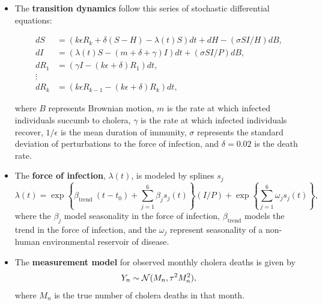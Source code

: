 \documentclass{article}
\begin{document}
\begin{itemize}
    \item The \textbf{transition dynamics} follow this series of stochastic differential equations:

    \begin{align}
        d S&=\left(k \epsilon R_k+\delta(S-H)-\lambda(t) S\right) d t+d H-(\sigma S I / H) d B, \\ 
        d I&=\left(\lambda(t) S-(m+\delta+\gamma) I\right) d t+(\sigma S I / P) d B, \\ 
        d R_1&=\left(\gamma I-(k \epsilon+\delta) R_1\right) d t, \\ 
        \vdots \\ 
        d R_k&=\left(k \epsilon R_{k-1}-(k \epsilon+\delta) R_k\right) d t,
    \end{align}
    
    where $B$ represents Brownian motion, $m$ is the rate at which infected individuals succumb to cholera, $\gamma$ is the rate at which infected individuals recover, $1/\epsilon$ is the mean duration of immunity, $\sigma$ represents the standard deviation of perturbations to the force of infection, and $\delta=0.02$ is the death rate. 

    \item The \textbf{force of infection}, $\lambda(t)$, is modeled by splines $s_j$
    \begin{equation}
        \lambda(t)=\exp \left\{\beta_{\text {trend }}\left(t-t_0\right)+\sum_{j=1}^{6} \beta_j s_j(t)\right\}(I / P) + \exp \left\{\sum_{j=1}^{6} \omega_j s_j(t)\right\},
    \end{equation}
    where the $\beta_j$ model seasonality in the force of infection, $\beta_{\text{trend}}$ models the trend in the force of infection, and the $\omega_j$ represent seasonality of a non-human environmental reservoir of disease. 
    \item The \textbf{measurement model} for observed monthly cholera deaths is given by 
    \begin{equation}
        Y_n \sim {\mathcal{N}}(M_n, \tau^2M_n^2),
    \end{equation}
    where $M_n$ is the true number of cholera deaths in that month.
\end{itemize}
\end{document}
